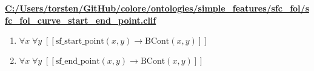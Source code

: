 \documentclass{article}
\begin{document}
\textbf{\url{C:/Users/torsten/GitHub/colore/ontologies/simple\_features/sfc\_fol/sfc\_fol\_curve\_start\_end\_point.clif}}

\begin{enumerate}
\item $\forall x\; \forall y\;  \left[ \left[ \textrm{sf\_start\_point}(x,y) \rightarrow \textrm{BCont}(x,y) \right] \right]$
\item $\forall x\; \forall y\;  \left[ \left[ \textrm{sf\_end\_point}(x,y) \rightarrow \textrm{BCont}(x,y) \right] \right]$
\end{enumerate}
\end{document}
